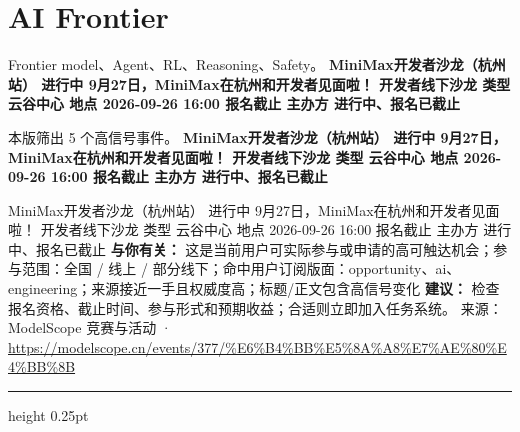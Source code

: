\documentclass[10.5pt]{ctexart}
\begin{document}
\section*{AI Frontier}
{\color{ormuted} Frontier model、Agent、RL、Reasoning、Safety。}
\vspace{2mm}
{\LARGE\bfseries MiniMax开发者沙龙（杭州站） 进行中 9月27日，MiniMax在杭州和开发者见面啦！ 开发者线下沙龙 类型 云谷中心 地点 2026-09-26 16:00 报名截止 主办方 进行中、报名已截止}\par
\vspace{1mm}
{\color{ormuted} 本版筛出 5 个高信号事件。}
\vspace{3mm}
{\Large\bfseries MiniMax开发者沙龙（杭州站） 进行中 9月27日，MiniMax在杭州和开发者见面啦！ 开发者线下沙龙 类型 云谷中心 地点 2026-09-26 16:00 报名截止 主办方 进行中、报名已截止}\par
MiniMax开发者沙龙（杭州站） 进行中 9月27日，MiniMax在杭州和开发者见面啦！ 开发者线下沙龙 类型 云谷中心 地点 2026-09-26 16:00 报名截止 主办方 进行中、报名已截止
\textbf{与你有关：} 这是当前用户可实际参与或申请的高可触达机会；参与范围：全国 / 线上 / 部分线下；命中用户订阅版面：opportunity、ai、engineering；来源接近一手且权威度高；标题/正文包含高信号变化
\textbf{建议：} 检查报名资格、截止时间、参与形式和预期收益；合适则立即加入任务系统。
{\footnotesize\color{ormuted} 来源：ModelScope 竞赛与活动 · \url{https://modelscope.cn/events/377/%E6%B4%BB%E5%8A%A8%E7%AE%80%E4%BB%8B}}
\vspace{4mm}
\hrule height 0.25pt
\vspace{3mm}
\end{document}
